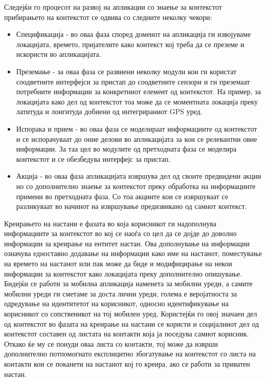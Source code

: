 Следејќи го процесот на развој на апликации со знаење за контекстот прибирањето
на контекстот се одвива со следните неколку чекори: 
\begin{itemize}
  \item Спецификација - во оваа фаза
според доменот на апликација ги извојуваме локацијата, времето, пријателите како
контекст кој треба да се преземе и искористи во апликацијата.
  \item Преземање - за оваа фаза се развиени неколку модули кои ги користат
  соодветните интерфејси за пристап до соодветните сензори и ги преземаат
  потребните информации за конкретниот елемент од контекстот. На пример, за
  локацијата како дел од контекстот тоа може да се моментната локација преку
  латитуда и лонгитуда добиени од интегрираниот GPS уред.
  \item   Испорака и прием - во оваа фаза се моделираат информациите од контекстот и се
  испорачуваат до оние делови во апликацијата за кои се релевантни овие
  информации. За таа цел во модулите од претходната фаза се
моделира контекстот и се обезбедува интерфејс за пристап.
\item Акција - во оваа фаза апликацијата извршува дел од своите предвидени акции но со
дополнително знаење за контекстот преку обработка на информациите примени во
претходната фаза. Со тоа акциите кои се извршуваат се разликуваат во начинот на
извршување предизвикано од самиот контекст.   
\end{itemize}

Креирањето на настани е фазата во која корисникот ги надополнува информациите за
контекстот во кој се наоѓа со цел да се дојде до доволно информации за креирање
на ентитет настан. Ова дополнување на информации означува едноставно додавање на
информации како име на настанот, поместување на времето на настанот или пак може
да биде и модифицирање на некои информации за контекстот како локацијата преку
дополнително опишување. Бидејќи се работи за мобилна апликација наменета за
мобилни уреди, а самите мобилни уреди ги сметаме за доста лични уреди, голема е
веројатноста за одредување на идентитетот на корисникот, односно идентификување
на корисникот со сопственикот на тој мобилен уред. Користејќи го овој значаен
дел од контекстот во фазата на креирање на настани се користи и социјалниот дел
од контекстот составен од листата на контакти која ја поседува самиот корисник.
Откако ќе му се понуди оваа листа со контакти, тој може да изврши дополнително
потпомогнато експлицитно збогатување на контекстот со листа на контакти кои се
поканети на настанот кој го креира, ако се работи за приватен настан.

